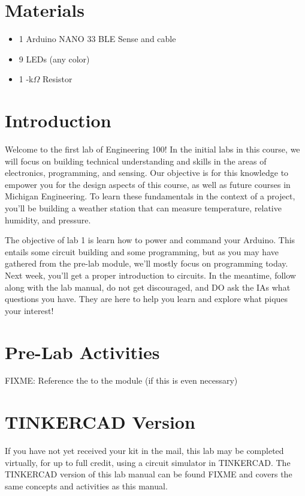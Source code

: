 \documentclass[12pt]{article}
\begin{document}
	\maketitle
	\thispagestyle{fancy}
	
	\section*{Materials}
	\begin{itemize}
		\item 1 \quad Arduino NANO 33 BLE Sense and cable
		\item 9 \quad LEDs (any color)
		\item 1 -k$\Omega$ Resistor
	\end{itemize}
	
	\section*{Introduction}
	Welcome to the first lab of Engineering 100! In the initial labs in this course, we will focus on building technical understanding and skills in the areas of electronics, programming, and sensing. Our objective is for this knowledge to empower you for the design aspects of this course, as well as future courses in Michigan Engineering. To learn these fundamentals in the context of a project, you’ll be building a weather station that can measure temperature, relative humidity, and pressure.\newline
	
	The objective of lab 1 is learn how to power and command your Arduino. This entails some circuit building and some programming, but as you may have gathered from the pre-lab module, we’ll mostly focus on programming today. Next week, you’ll get a proper introduction to circuits. In the meantime, follow along with the lab manual, do not get discouraged, and DO ask the IAs what questions you have. They are here to help you learn and explore what piques your interest! 

	\section*{Pre-Lab Activities}
	FIXME: Reference the to the module (if this is even necessary)
	
	\section*{TINKERCAD Version}
    If you have not yet received your kit in the mail, this lab may be completed virtually, for up to full credit, using a circuit simulator in TINKERCAD. The TINKERCAD version of this lab manual can be found FIXME and covers the same concepts and activities as this manual.
\end{document}
